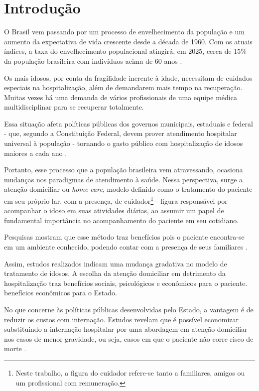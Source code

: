 \chapter{Introdução}\label{cap:introducao}

O Brasil vem passando por um processo de envelhecimento da população e
um aumento da expectativa de vida crescente desde a década de 1960. 
Com os atuais índices, a taxa do envelhecimento populacional atingirá, 
em 2025, cerca de 15\% da população brasileira com indivíduos acima 
de 60 anos \cite{gonccalves2006perfil}. 

Os mais idosos, por conta da fragilidade inerente à idade, necessitam de 
cuidados especiais na hospitalização, além de demandarem mais tempo na 
recuperação. Muitas vezes há uma demanda de vários profissionais de uma equipe 
médica multidisciplinar para se recuperar totalmente.

Essa situação afeta políticas públicas dos governos municipais, estaduais e
federal - que, segundo a Constituição Federal, devem prover atendimento
hospitalar universal à população - tornando o gasto público com hospitalização
de idosos maiores a cada ano \cite{da2013gastos}.

Portanto, esse processo que a população brasileira vem atravessando, ocasiona
mudanças  nos paradigmas de atendimento à saúde. Nessa perspectiva, surge a
atenção domiciliar %
ou \textit{home care}, modelo definido como o tratamento do paciente
em seu próprio lar, com a presença, de cuidador\footnote{Neste trabalho, a
figura do cuidador refere-se tanto a familiares, amigos ou um profissional com
remuneração.} - figura responsável por acompanhar o idoso em suas atividades
diárias, ao assumir um papel de fundamental importância no acompanhamento do
paciente em seu cotidiano.

Pesquisas mostram que esse método traz benefícios pois o  paciente encontra-se
em um ambiente conhecido, podendo contar com a presença de seus familiares
\cite{hermann2007atendimento, day2010beneficios}.

Assim, estudos realizados indicam uma mudança gradativa no modelo de tratamento
de idosos. A escolha da atenção domiciliar em detrimento da hospitalização traz
benefícios sociais, psicológicos e econômicos para o paciente. %
benefícios econômicos para o Estado.

No que concerne às políticas públicas desenvolvidas pelo Estado,  a vantagem é
de reduzir os custos com internação. Estudos revelam  que é possível economizar
substituindo a internação hospitalar por uma  abordagem em atenção domiciliar
nos casos de menor gravidade,  ou seja, casos em que o paciente não corre risco
de morte \cite{bourdette1993health}.  %

